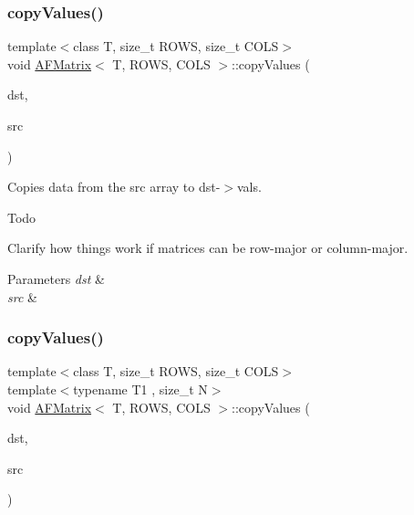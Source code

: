 \subsubsection{\texorpdfstring{copy\+Values()}{copyValues()}\hspace{0.1cm}{\footnotesize\ttfamily [3/4]}}
{\footnotesize\ttfamily template$<$class T, size\+\_\+t R\+O\+WS, size\+\_\+t C\+O\+LS$>$ \\
void \hyperlink{class_a_f_matrix}{A\+F\+Matrix}$<$ T, R\+O\+WS, C\+O\+LS $>$\+::copy\+Values (\begin{DoxyParamCaption}\item[{\hyperlink{class_a_f_matrix}{A\+F\+Matrix}$<$ T, R\+O\+WS, C\+O\+LS $>$ $\ast$}]{dst,  }\item[{array$<$ T, R\+O\+WS $\ast$C\+O\+LS $>$ $\ast$}]{src }\end{DoxyParamCaption})\hspace{0.3cm}{\ttfamily [inline]}}

Copies data from the {\ttfamily src} array to {\ttfamily dst-\/$>$vals}. \begin{DoxyRefDesc}{Todo}
\item[\hyperlink{todo__todo000004}{Todo}]Clarify how things work if matrices can be row-\/major or column-\/major. \end{DoxyRefDesc}

\begin{DoxyParams}{Parameters}
{\em dst} & \\
\hline
{\em src} & \\
\hline
\end{DoxyParams}
\mbox{\label{class_a_f_matrix_ac8930dd6d5ea5167fed5c768b96635f7}} 
\subsubsection{\texorpdfstring{copy\+Values()}{copyValues()}\hspace{0.1cm}{\footnotesize\ttfamily [4/4]}}
{\footnotesize\ttfamily template$<$class T, size\+\_\+t R\+O\+WS, size\+\_\+t C\+O\+LS$>$ \\
template$<$typename T1 , size\+\_\+t N$>$ \\
void \hyperlink{class_a_f_matrix}{A\+F\+Matrix}$<$ T, R\+O\+WS, C\+O\+LS $>$\+::copy\+Values (\begin{DoxyParamCaption}\item[{array$<$ T1, N $>$ $\ast$}]{dst,  }\item[{array$<$ T1, N $>$ $\ast$}]{src }\end{DoxyParamCaption})\hspace{0.3cm}{\ttfamily [inline]}}

